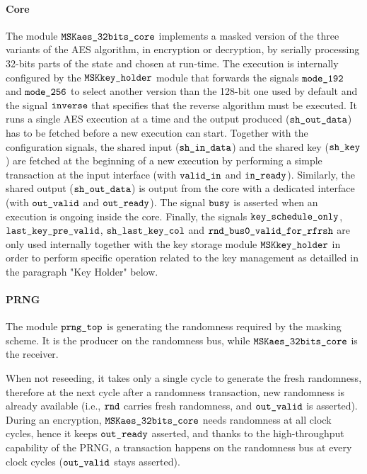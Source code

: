 \documentclass{scrartcl}
\begin{document}
\paragraph{Core}
The module $\texttt{MSKaes\_32bits\_core}$ implements a masked version of the three variants of
the AES algorithm, in encryption or decryption, by serially processing 32-bits
parts of the state and chosen at run-time. The execution is internally
configured by the $\texttt{MSKkey\_holder}$ module that forwards the signals
$\texttt{mode\_192}$ and $\texttt{mode\_256}$ to select another version than the 128-bit
one used by default and the signal $\texttt{inverse}$ that specifies that the
reverse algorithm must be executed. It runs a single AES execution at a time
and the output produced ($\texttt{sh\_out\_data}$) has to be fetched before a new
execution can start. Together with the configuration signals, the shared input ($\texttt{sh\_in\_data}$) and the shared key
($\texttt{sh\_key}$) are fetched at the beginning of a new execution by performing
a simple transaction at the input interface (with $\texttt{valid\_in}$ and
$\texttt{in\_ready}$).  Similarly, the shared output ($\texttt{sh\_out\_data}$) is output
from the core with a dedicated interface (with $\texttt{out\_valid}$ and
$\texttt{out\_ready}$). The signal $\texttt{busy}$ is asserted when an execution is
ongoing inside the core.
Finally, the signals $\texttt{key\_schedule\_only}$, $\texttt{last\_key\_pre\_valid}$, 
$\texttt{sh\_last\_key\_col}$ and $\texttt{rnd\_bus0\_valid\_for\_rfrsh}$ are only used internally together with the key storage module $\texttt{MSKkey\_holder}$ in order to perform specific operation 
related to the key management as detailled in the paragraph "Key Holder" below. 

\paragraph{PRNG}
The module $\texttt{prng\_top}$ is generating the randomness required by the 
masking scheme. It is the producer on the randomness bus, while $\texttt{MSKaes\_32bits\_core}$ is
the receiver.

When not reseeding, it takes only a single cycle to generate the fresh randomness, therefore
at the next cycle after a randomness transaction, new randomness is already available (i.e.,
$\texttt{rnd}$ carries fresh randomness, and $\texttt{out\_valid}$ is asserted).
During an encryption, $\texttt{MSKaes\_32bits\_core}$ needs randomness at all clock cycles, hence
it keeps $\texttt{out\_ready}$ asserted, and thanks to the high-throughput
capability of the PRNG, a transaction happens on the randomness bus at every
clock cycles ($\texttt{out\_valid}$ stays asserted).
\end{document}
